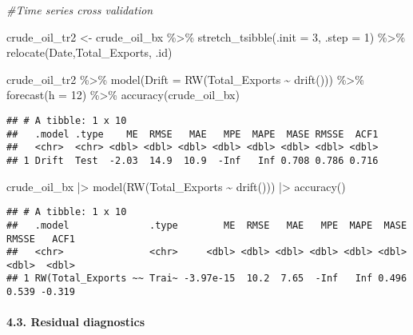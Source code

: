 \documentclass[
]{article}
\newenvironment{Shaded}{\begin{snugshade}}{\end{snugshade}}
\newcommand{\AttributeTok}[1]{\textcolor[rgb]{0.77,0.63,0.00}{#1}}
\newcommand{\CommentTok}[1]{\textcolor[rgb]{0.56,0.35,0.01}{\textit{#1}}}
\newcommand{\DecValTok}[1]{\textcolor[rgb]{0.00,0.00,0.81}{#1}}
\newcommand{\FunctionTok}[1]{\textcolor[rgb]{0.00,0.00,0.00}{#1}}
\newcommand{\NormalTok}[1]{#1}
\newcommand{\OtherTok}[1]{\textcolor[rgb]{0.56,0.35,0.01}{#1}}
\newcommand{\SpecialCharTok}[1]{\textcolor[rgb]{0.00,0.00,0.00}{#1}}
\begin{document}
\begin{Shaded}
\begin{Highlighting}[]
\CommentTok{\#Time series cross validation}

\NormalTok{crude\_oil\_tr2 }\OtherTok{\textless{}{-}}\NormalTok{ crude\_oil\_bx }\SpecialCharTok{\%\textgreater{}\%}
\FunctionTok{stretch\_tsibble}\NormalTok{(}\AttributeTok{.init =} \DecValTok{3}\NormalTok{, }\AttributeTok{.step =} \DecValTok{1}\NormalTok{) }\SpecialCharTok{\%\textgreater{}\%}
\FunctionTok{relocate}\NormalTok{(Date,Total\_Exports, .id)}

\NormalTok{crude\_oil\_tr2 }\SpecialCharTok{\%\textgreater{}\%}
\FunctionTok{model}\NormalTok{(}\AttributeTok{Drift =} \FunctionTok{RW}\NormalTok{(Total\_Exports }\SpecialCharTok{\textasciitilde{}} \FunctionTok{drift}\NormalTok{())) }\SpecialCharTok{\%\textgreater{}\%}
\FunctionTok{forecast}\NormalTok{(}\AttributeTok{h =} \DecValTok{12}\NormalTok{) }\SpecialCharTok{\%\textgreater{}\%}
\FunctionTok{accuracy}\NormalTok{(crude\_oil\_bx)}
\end{Highlighting}
\end{Shaded}

\begin{verbatim}
## # A tibble: 1 x 10
##   .model .type    ME  RMSE   MAE   MPE  MAPE  MASE RMSSE  ACF1
##   <chr>  <chr> <dbl> <dbl> <dbl> <dbl> <dbl> <dbl> <dbl> <dbl>
## 1 Drift  Test  -2.03  14.9  10.9  -Inf   Inf 0.708 0.786 0.716
\end{verbatim}

\begin{Shaded}
\begin{Highlighting}[]
\NormalTok{crude\_oil\_bx }\SpecialCharTok{|\textgreater{}}
  \FunctionTok{model}\NormalTok{(}\FunctionTok{RW}\NormalTok{(Total\_Exports }\SpecialCharTok{\textasciitilde{}} \FunctionTok{drift}\NormalTok{())) }\SpecialCharTok{|\textgreater{}}
  \FunctionTok{accuracy}\NormalTok{()}
\end{Highlighting}
\end{Shaded}

\begin{verbatim}
## # A tibble: 1 x 10
##   .model              .type        ME  RMSE   MAE   MPE  MAPE  MASE RMSSE   ACF1
##   <chr>               <chr>     <dbl> <dbl> <dbl> <dbl> <dbl> <dbl> <dbl>  <dbl>
## 1 RW(Total_Exports ~~ Trai~ -3.97e-15  10.2  7.65  -Inf   Inf 0.496 0.539 -0.319
\end{verbatim}

\hypertarget{residual-diagnostics}{%
\paragraph{4.3. Residual diagnostics}\label{residual-diagnostics}}
\end{document}
